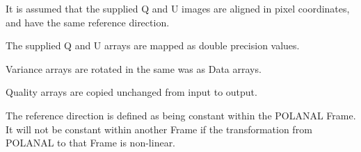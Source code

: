\documentclass[twoside,11pt]{starlink}
\begin{document}
{{{         \sstitem
         It is assumed that the supplied Q and U images are aligned in
         pixel coordinates, and have the same reference direction.

         \sstitem
         The supplied Q and U arrays are mapped as double precision values.

         \sstitem
         Variance arrays are rotated in the same was as Data arrays.

         \sstitem
         Quality arrays are copied unchanged from input to output.

         \sstitem
         The reference direction is defined as being constant within the
         POLANAL Frame. It will not be constant within another Frame if the
         transformation from POLANAL to that Frame is non-linear.
      }
   }
}
\end{document}
